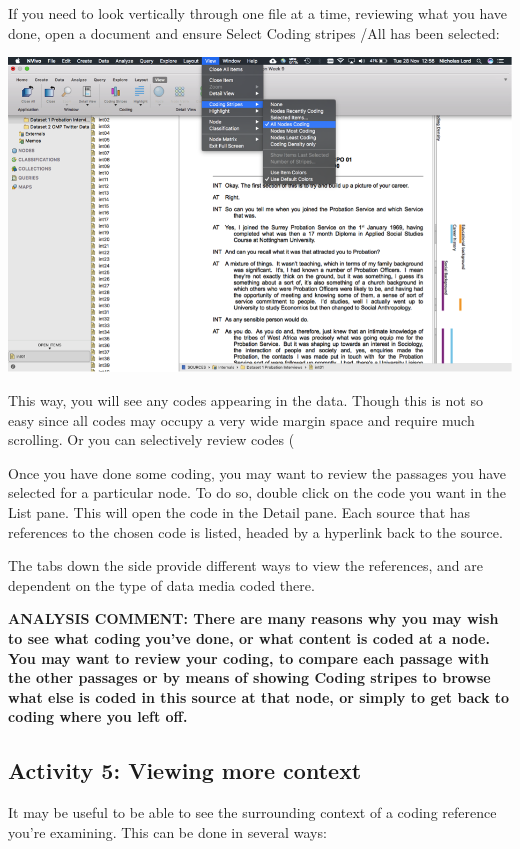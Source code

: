 \documentclass[]{book}
\theoremstyle{definition}
\theoremstyle{definition}
\theoremstyle{definition}
\theoremstyle{remark}
\begin{document}
If you need to look vertically through one file at a time, reviewing
what you have done, open a document and ensure Select Coding stripes
/All has been selected:

\includegraphics{imgs/qual_51.png}

This way, you will see any codes appearing in the data. Though this is
not so easy since all codes may occupy a very wide margin space and
require much scrolling. Or you can selectively review codes (

Once you have done some coding, you may want to review the passages you
have selected for a particular node. To do so, double click on the code
you want in the List pane. This will open the code in the Detail pane.
Each source that has references to the chosen code is listed, headed by
a hyperlink back to the source.

The tabs down the side provide different ways to view the references,
and are dependent on the type of data media coded there.

\textbf{ANALYSIS COMMENT: There are many reasons why you may wish to see
what coding you've done, or what content is coded at a node. You may
want to review your coding, to compare each passage with the other
passages or by means of showing Coding stripes to browse what else is
coded in this source at that node, or simply to get back to coding where
you left off. }

\hypertarget{activity-5-viewing-more-context}{%
\subsection{Activity 5: Viewing more
context}\label{activity-5-viewing-more-context}}

It may be useful to be able to see the surrounding context of a coding
reference you're examining. This can be done in several ways:
\end{document}
